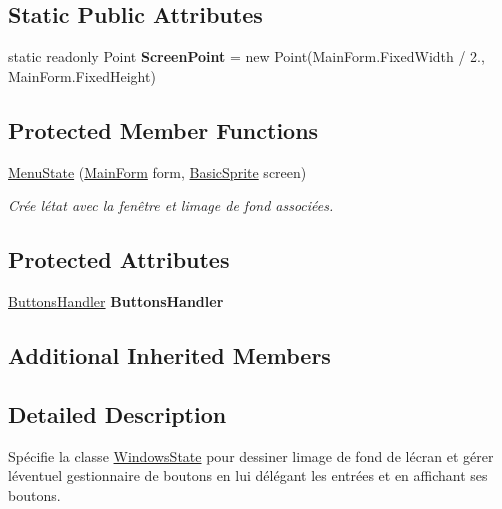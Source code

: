 \subsection*{Static Public Attributes}
\begin{DoxyCompactItemize}
\item 
\mbox{\label{class_tentacle_slicers_1_1windows_1_1_menu_state_aa45ee29127d21e470ddb058bb05566f0}} 
static readonly Point {\bfseries Screen\+Point} = new Point(Main\+Form.\+Fixed\+Width / 2., Main\+Form.\+Fixed\+Height)
\end{DoxyCompactItemize}
\subsection*{Protected Member Functions}
\begin{DoxyCompactItemize}
\item 
\hyperlink{class_tentacle_slicers_1_1windows_1_1_menu_state_abddb0d07d620c477680721407fdaa454}{Menu\+State} (\hyperlink{class_tentacle_slicers_1_1windows_1_1_main_form}{Main\+Form} form, \hyperlink{class_tentacle_slicers_1_1graphics_1_1_basic_sprite}{Basic\+Sprite} screen)
\begin{DoxyCompactList}\small\item\em Crée l\textquotesingle{}état avec la fenêtre et l\textquotesingle{}image de fond associées. \end{DoxyCompactList}\end{DoxyCompactItemize}
\subsection*{Protected Attributes}
\begin{DoxyCompactItemize}
\item 
\mbox{\label{class_tentacle_slicers_1_1windows_1_1_menu_state_a313800565da3947dce9859126c14d01b}} 
\hyperlink{class_tentacle_slicers_1_1hud_1_1_buttons_handler}{Buttons\+Handler} {\bfseries Buttons\+Handler}
\end{DoxyCompactItemize}
\subsection*{Additional Inherited Members}


\subsection{Detailed Description}
Spécifie la classe \hyperlink{class_tentacle_slicers_1_1windows_1_1_windows_state}{Windows\+State} pour dessiner l\textquotesingle{}image de fond de l\textquotesingle{}écran et gérer l\textquotesingle{}éventuel gestionnaire de boutons en lui délégant les entrées et en affichant ses boutons. 



